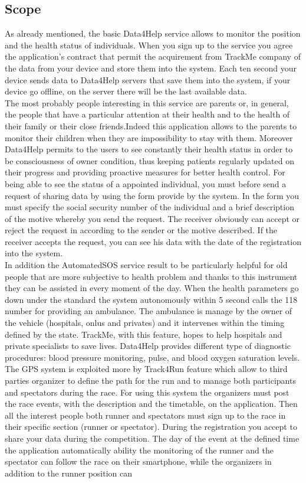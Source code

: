 \subsection{Scope}
As already mentioned, the basic Data4Help service allows to monitor the position and the health status of individuals. When you sign up to the service you agree the application's contract that permit the acquirement from TrackMe company of the data from your device and store them into the system. Each ten second your device sends data to Data4Help servers that save them into the system, if your device go offline, on the server there will be the last available data.\\ The most probably people interesting in this service are parents or, in general, the people that have a particular attention at their health and to the health of their family or their close friends.Indeed this application allows to the parents to monitor their children when they are impossibility to stay with them. Moreover Data4Help permits to the users to see constantly their health status in order to be consciousness of owner condition, thus keeping patients regularly updated on their progress and providing proactive measures for better health control. For being able to see the status of a appointed individual, you must before send a request of sharing data by using the form provide by the system. In the form you must specify the social security number of the individual and a brief description of the motive whereby you send the request. The receiver obviously can accept or reject the request in according to the sender or the motive described. If the receiver accepts the request, you can see his data with the date of the registration into the system.\\ In addition the AutomatedSOS service result to be particularly helpful for old people that are more subjective to health problem and thanks to this instrument they can be assisted in every moment of the day. When the health parameters go down under the standard the system autonomously within 5 second calls the 118 number for providing an ambulance. The ambulance is manage by the owner of the vehicle (hospitals, onlus and privates) and it intervenes within the timing defined by the state. TrackMe, with this feature, hopes to help hospitals and private specialists to save lives. Data4Help provides different type of diagnostic procedures: blood pressure monitoring, pulse, and blood oxygen saturation levels.\\ The GPS system is exploited more by Track4Run feature which allow to third parties organizer to define the path for the run and to manage both participants and spectators during the race. For using this system the organizers must post the race events, with the description and the timetable, on the application. Then all the interest people both runner and spectators must sign up to the race in their specific section (runner or spectator). During the registration you accept to share your data during the competition. The day of the event at the defined time the application automatically ability the monitoring of the runner and the spectator can follow the race on their smartphone, while the organizers in addition to the runner position can 